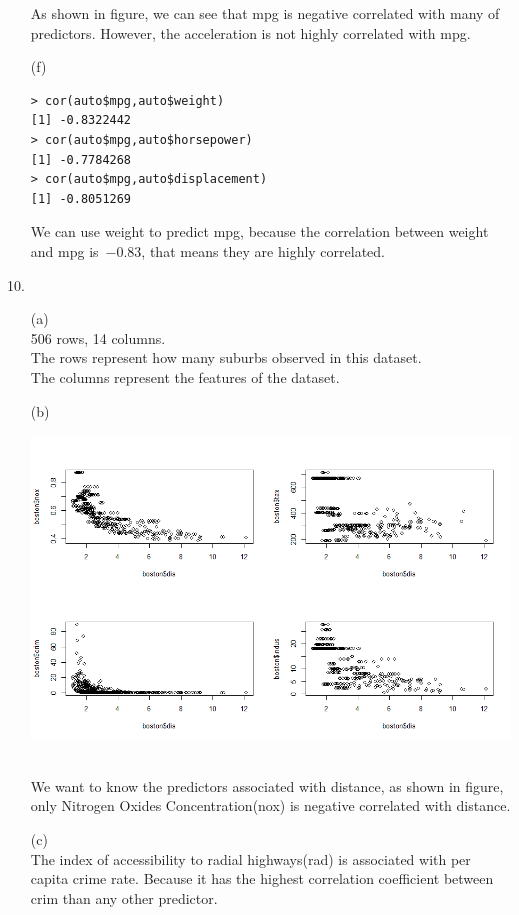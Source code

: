 \documentclass[12pt]{article}
\begin{document}
\begin{itemize}
\hspace{25pt}As shown in figure, we can see that mpg is negative correlated with many of predictors.
However, the acceleration is not highly correlated with mpg.\\
\item[(f)]
\ \\
\begin{verbatim}
> cor(auto$mpg,auto$weight)
[1] -0.8322442
> cor(auto$mpg,auto$horsepower)
[1] -0.7784268
> cor(auto$mpg,auto$displacement)
[1] -0.8051269
\end{verbatim}
We can use weight to predict mpg, because the correlation between weight and mpg is\ $-0.83$, that means they are highly correlated.
\end{itemize}
\newpage
10.
\begin{itemize}
\item[\small(a)]
\ \\
\small 506 rows, 14 columns.\\[3ex]
The rows represent how many suburbs observed in this dataset. \\[3ex]
The columns represent the features of  the dataset.
\item[(b)]
\ \\
\centerline{\includegraphics[width=1.15\linewidth]{four}}\\[4ex]
We want to know the predictors associated with distance, as shown in figure, only Nitrogen Oxides Concentration(nox) is negative correlated with distance.
\item[(c)]
\ \\[2ex]
The index of accessibility to radial highways(rad) is associated with per capita crime rate. Because it has the highest correlation coefficient between crim than any other predictor.\\[3ex]

\end{itemize}
\end{document}
